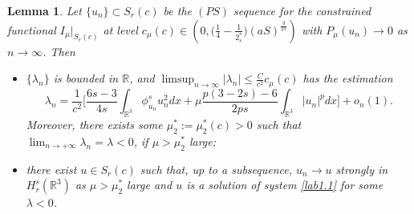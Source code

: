 \documentclass[11pt]{article}
\numberwithin{equation}{section}
\newtheorem{lemma}[theorem]{Lemma}
\begin{document}
\begin{lemma}\label{rem5.91} 
Let $\{u_n\} \subset S_r(c)$ be the  $(PS)$ sequence for the constrained functional
 $I_\mu|_{S_r(c)}$ at level 
 $c_\mu(c)\in \left(0, \Big(\frac{1}{4}-\frac{1}{2^*_s}\Big)(aS)^{\frac{3}{2s}}\right)$ 
with $P_\mu(u_n)\to 0$ as $n\to \infty$. Then
\begin{itemize}
\item[(i)] $\{\lambda_n\}$ is bounded in $\mathbb{R}$, and 
$\limsup_{n\to \infty}|\lambda_n|\leq \frac{C}{c^2}c_\mu(c)$ has the  
estimation
$$
\lambda_n=\frac{1}{c^2}\Big[\frac{6s-3}{4s}\int_{\mathbb{R}^3}\phi^s_{u_n} u^2_ndx
+\mu \frac{p(3-2s)-6}{2ps}\int_{\mathbb{R}^3}|u_n|^pdx\Big]+o_n(1).
$$
Moreover, there exists some $\mu^*_2:=\mu^*_2(c)>0$ such that 
$\lim_{n\to +\infty}\lambda_n=\lambda<0$, if $\mu> \mu^*_2$ large;

\item[(ii)] there exist $u\in S_r(c)$ such that, up to a subsequence, 
$u_n\to u$ strongly in $H^s_r(\mathbb{R}^3)$ as  $\mu> \mu^*_2$ large and 
$u$ is a solution of  system \eqref{lab1.1} for some $\lambda<0$.
\end{itemize}
\end{lemma}
\end{document}
